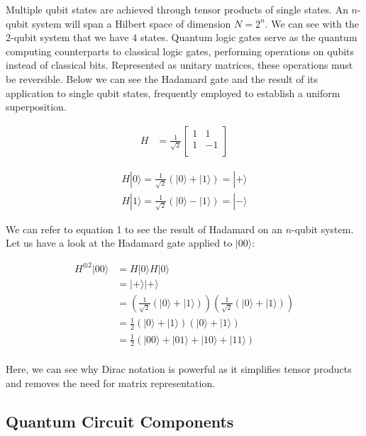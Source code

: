 \documentclass[twocolumn,showpacs,preprintnumbers,amsmath,amssymb]{revtex4}
\begin{document}
		
		Multiple qubit states are achieved through tensor products of single states. An $n$-qubit system will span a Hilbert space of dimension $N = 2^n $. We can see with the $2$-qubit system that we have $4$ states. Quantum logic gates serve as the quantum computing counterparts to classical logic gates, performing operations on qubits instead of classical bits. Represented as unitary matrices, these operations must be reversible. Below we can see the Hadamard gate and the result of its application to single qubit states, frequently employed to establish a uniform superposition.
		
		\begin{align*}	
			H &=\frac{1}{\sqrt{2}} \begin{bmatrix}
				1 & 1 \\
				1 &-1 \\
			\end{bmatrix}
		\end{align*}
		
		\begin{align*}	
		H|0\rangle = \frac{1}{\sqrt{2}} (|0\rangle + |1\rangle) = |+\rangle\\
		H|1\rangle = \frac{1}{\sqrt{2}} (|0\rangle - |1\rangle) = |-\rangle
		\end{align*}
			
		We can refer to equation 1 to see the result of Hadamard on an $n$-qubit system. Let us have a look at the Hadamard gate applied to $|00\rangle$:
		
		\begin{align*}	
		H^{\otimes 2}|00\rangle &= H|0\rangle H|0\rangle\\
		&= |+\rangle|+\rangle\\
		&= (\frac{1}{\sqrt{2}} (|0\rangle + |1\rangle))(\frac{1}{\sqrt{2}} (|0\rangle + |1\rangle))\\
		&= \frac{1}{2} (|0\rangle + |1\rangle)(|0\rangle + |1\rangle)\\
		&= \frac{1}{2} (|00\rangle + |01\rangle + |10\rangle + |11\rangle)\\
		\end{align*}
		
		Here, we can see why Dirac notation is powerful as it simplifies tensor products and removes the need for matrix representation.
		
		\subsection{Quantum Circuit Components}
		
\end{document}
